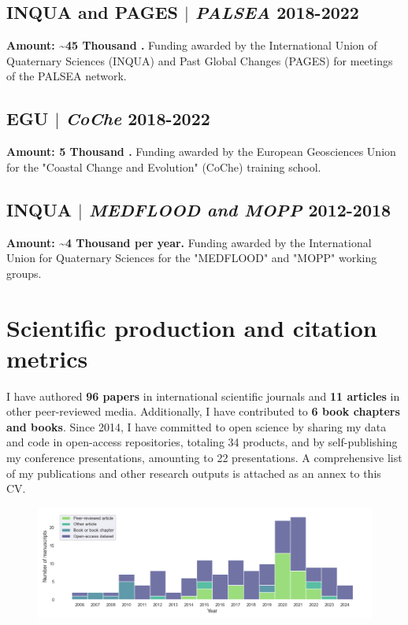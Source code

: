 \documentclass[11pt]{article}
\begin{document}
\bigskip

\subsection{INQUA and PAGES $|$ {\normalfont\textit{PALSEA}} \hfill 2018-2022}
{\footnotesize \textbf{Amount: \textasciitilde 45 Thousand \texteuro.} Funding awarded by the International Union of Quaternary Sciences (INQUA) and Past Global Changes (PAGES) for meetings of the PALSEA network.}
\bigskip

\subsection{EGU $|$ {\normalfont\textit{CoChe}} \hfill 2018-2022}
{\footnotesize \textbf{Amount: 5 Thousand \texteuro.} Funding awarded by the European Geosciences Union for the "Coastal Change and Evolution" (CoChe) training school.}
\bigskip

\subsection{INQUA $|$ {\normalfont\textit{MEDFLOOD and MOPP}} \hfill 2012-2018}
{\footnotesize \textbf{Amount: \textasciitilde 4 Thousand \texteuro \space per year.} Funding awarded by the International Union for Quaternary Sciences for the "MEDFLOOD" and "MOPP" working groups.}
\bigskip

\newpage

\section{Scientific production and citation metrics}
\bigskip

{\normalfont I have authored \textbf{96 papers} in international scientific journals and \textbf{11 articles} in other peer-reviewed media. Additionally, I have contributed to \textbf{6 book chapters and books}. Since 2014, I have committed to open science by sharing my data and code in open-access repositories, totaling 34 products, and by self-publishing my conference presentations, amounting to 22 presentations. A comprehensive list of my publications and other research outputs is attached as an annex to this CV.}

\begin{figure}[h]
\centering
\includegraphics[width=\textwidth]{img/products_per_year.png}
\end{figure}
\end{document}
